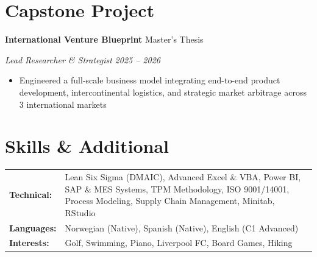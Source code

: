 \documentclass[11pt,letterpaper]{article}
\newcommand{\entry}[4]{%
  \noindent\textbf{#1} \hfill #2 \par\nopagebreak
  \textit{#3} \hfill \textit{#4} \par\nopagebreak
}
\begin{document}
\section{Capstone Project}

\entry{International Venture Blueprint}{Master's Thesis}{Lead Researcher \& Strategist}{2025 -- 2026}
\begin{itemize}
  \item Engineered a full-scale business model integrating end-to-end product development, intercontinental logistics, and strategic market arbitrage across 3 international markets
\end{itemize}
\vspace{0.3em}

\section{Skills \& Additional}

\begin{tabularx}{\textwidth}{@{}l X@{}}
\textbf{Technical:} & Lean Six Sigma (DMAIC), Advanced Excel \& VBA, Power BI, SAP \& MES Systems, TPM Methodology, ISO 9001/14001, Process Modeling, Supply Chain Management, Minitab, RStudio \\
\textbf{Languages:} & Norwegian (Native), Spanish (Native), English (C1 Advanced) \\
\textbf{Interests:} & Golf, Swimming, Piano, Liverpool FC, Board Games, Hiking \\
\end{tabularx}
\end{document}
